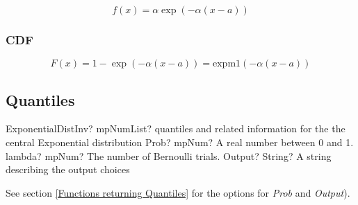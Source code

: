 \begin{equation} 
	f(x)=\alpha \exp(-\alpha (x-a))
\end{equation}

\subsubsection{CDF}
%
\begin{equation} 
	F(x)=1- \exp(-\alpha (x-a)) = \text{expm1}(-\alpha (x-a))
\end{equation}



\subsection{Quantiles}


\begin{mpFunctionsExtract}
	\mpFunctionThreeNotImplemented
	{ExponentialDistInv? mpNumList? quantiles and related information for the the central Exponential distribution}
	{Prob? mpNum? A real number between 0 and 1.}
	{lambda? mpNum? The number of Bernoulli trials.}
	{Output? String? A string describing the output choices}
\end{mpFunctionsExtract}

\vspace{0.3cm}
See section \ref{Functions returning Quantiles} for the options for  {\itshape\sffamily Prob} and {\itshape\sffamily Output}). 


